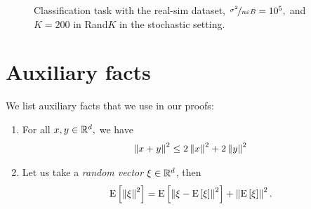 \documentclass{article}
\newcommand*{\probavailable}{\ensuremath{p_{\textnormal{a}}}}
\begin{document}
\begin{figure}[h]
  \centering
  \caption{Classification task with the real-sim dataset, $\nicefrac{\sigma^2}{n \varepsilon B} = 10^5,$ and $K = 200$ in Rand$K$ in the stochastic setting.}
  \label{fig:real_sim_stochastic}
\end{figure}




\newpage
\appendix
\tableofcontents

\section{Auxiliary facts}
We list auxiliary facts that we use in our proofs:
\begin{enumerate}
    \item 
        For all $x, y \in \mathbb{R}^d,$ we have
        \begin{align}
            \left\| x + y \right\|^2 \leq 2\left\| x \right\|^2 + 2\left\| y \right\|^2
            \label{auxiliary:jensen_inequality}
        \end{align}
    \item
        Let us take a \textit{random vector} $\xi \in \mathbb{R}^d$, then
        \begin{align}
            {\rm E}\left[\left\| \xi \right\|^2\right] = {\rm E}\left[\left\| \xi - {\rm E}\left[\xi\right] \right\|^2\right] + \left\| {\rm E}\left[\xi\right] \right\|^2.
            \label{auxiliary:variance_decomposition}
        \end{align}
\end{enumerate}
\end{document}
